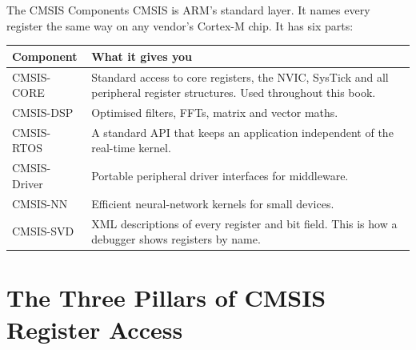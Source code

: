 \documentclass[9pt,aspectratio=169,xcolor=table]{beamer}
\begin{document}
\begin{frame}{The CMSIS Components}
    \leavevmode
    CMSIS is ARM's standard layer. It names every register the same way on any vendor's Cortex-M chip. It has six parts:

    \vspace{2mm}
    \begin{center}
    {\small
    \striped
    \begin{tabular}{@{}l R{.66\textwidth}@{}}
        \toprule
        \textbf{Component} & \textbf{What it gives you} \\
        \midrule
        \alert{CMSIS-CORE} & Standard access to core registers, the NVIC, SysTick and all peripheral register structures. \alert{Used throughout this book.} \\
        CMSIS-DSP & Optimised filters, FFTs, matrix and vector maths. \\
        CMSIS-RTOS & A standard API that keeps an application independent of the real-time kernel. \\
        CMSIS-Driver & Portable peripheral driver interfaces for middleware. \\
        CMSIS-NN & Efficient neural-network kernels for small devices. \\
        CMSIS-SVD & XML descriptions of every register and bit field. This is how a debugger shows registers by name. \\
        \bottomrule
    \end{tabular}}
    \end{center}
\end{frame}


\section{The Three Pillars of CMSIS Register Access}
\end{document}
